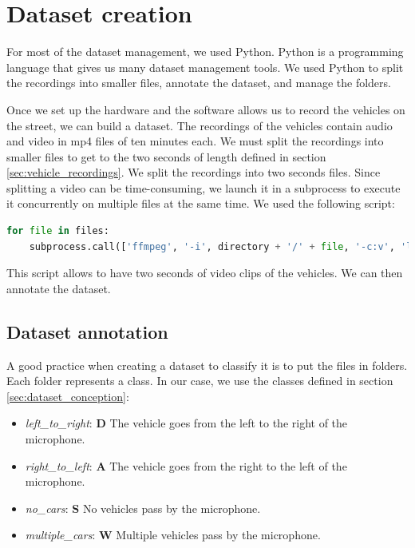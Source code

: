 \section{Dataset creation}

For most of the dataset management, we used Python. Python is a programming language that gives us many dataset management tools. We used Python to split the recordings into smaller files, annotate the dataset, and manage the folders.

Once we set up the hardware and the software allows us to record the vehicles on the street, we can build a dataset. The recordings of the vehicles contain audio and video in mp4 files of ten minutes each. We must split the recordings into smaller files to get to the two seconds of length defined in section \ref{sec:vehicle_recordings}. We split the recordings into two seconds files. Since splitting a video can be time-consuming, we launch it in a subprocess to execute it concurrently on multiple files at the same time. We used the following script:

\begin{lstlisting}[language=python]
for file in files:
    subprocess.call(['ffmpeg', '-i', directory + '/' + file, '-c:v', 'libx264', '-crf', '22', '-map', '0', '-segment_time', time, '-reset_timestamps', '1', '-g', '30', '-sc_threshold', '0', '-force_key_frames', 'expr:gte(t,n_forced*'+str(time)+')', '-f', 'segment', directory[:-1]+'-2sec/' + file + '%05d.mp4'])
\end{lstlisting}

This script allows to have two seconds of video clips of the vehicles. We can then annotate the dataset.

\subsection{Dataset annotation}

A good practice when creating a dataset to classify it is to put the files in folders. Each folder represents a class. In our case, we use the classes defined in section \ref{sec:dataset_conception}: 

\begin{itemize}
    \item  \textit{left\_to\_right}: \textbf{D} The vehicle goes from the left to the right of the microphone.
    \item  \textit{right\_to\_left}: \textbf{A} The vehicle goes from the right to the left of the microphone.
    \item  \textit{no\_cars}: \textbf{S} No vehicles pass by the microphone.
    \item  \textit{multiple\_cars}: \textbf{W} Multiple vehicles pass by the microphone.
\end{itemize}

